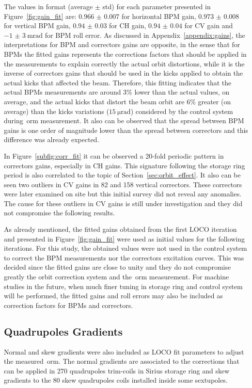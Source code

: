The values in format (average $\pm$ std) for each parameter presented in Figure~\ref{fig:gain_fit} are: $\num{0.966(7)}$ for horizontal BPM gain, $\num{0.973(8)}$ for vertical BPM gain, $\num{0.94(3)}$ for CH gain, $\num{0.94(4)}$ for CV gain and $\SI{-1(3)}{\milli\radian}$ for BPM roll error. As discussed in Appendix~\ref{appendix:gains}, the interpretations for BPM and correctors gains are opposite, in the sense that for BPMs the fitted gains represents the corrections factors that should be applied in the measurements to explain correctly the actual orbit distortions, while it is the inverse of correctors gains that should be used in the kicks applied to obtain the actual kicks that affected the beam. Therefore, this fitting indicates that the actual BPMs measurements are around $3\%$ lower than the actual values, on average, and the actual kicks that distort the beam orbit are $6\%$ greater (on average) than the kicks variations ($\SI{15}{\micro\radian}$) considered by the control system during~\gls{orm} measurement. It also can be observed that the spread between BPM gains is one order of magnitude lower than the spread between correctors and this difference was already expected.

In Figure~\ref{subfig:corr_fit} it can be observed a 20-fold periodic pattern in correctors gains, especially in CH gains. This signature following the storage ring period is also correlated to the topic of Section~\ref{sec:orbit_effect}. It also can be seen two outliers in CV gains in 82 and 158 vertical correctors. These correctors were later examined on site but this initial survey did not reveal any anomalies. The cause for these outliers in CV gains is still under investigation and they did not compromise the following results.

As already mentioned, the fitted gains obtained from the first LOCO iteration and presented in Figure~\ref{fig:gain_fit} were used as initial values for the following iterations. For this study, the obtained values were not used in the control system to correct the BPM measurements nor the correctors excitation curves. This was decided since the fitted gains are close to unity and they do not compromise greatly the orbit correction system and the~\gls{orm} measurement. For machine studies in the future, when much finer tuning in storage ring and control system will be performed, the fitted gains and roll errors may also be included as correction factors for BPMs and correctors.

\subsection{Quadrupoles Gradients}
Normal and skew gradients were also included as LOCO fit parameters to adjust the measured~\gls{orm}. The normal gradients are associated to the corrections that can be applied in 270 quadrupoles trim-coils in Sirius storage ring and skew gradients to the 80 skew quadrupoles coils installed inside some sextupoles.

